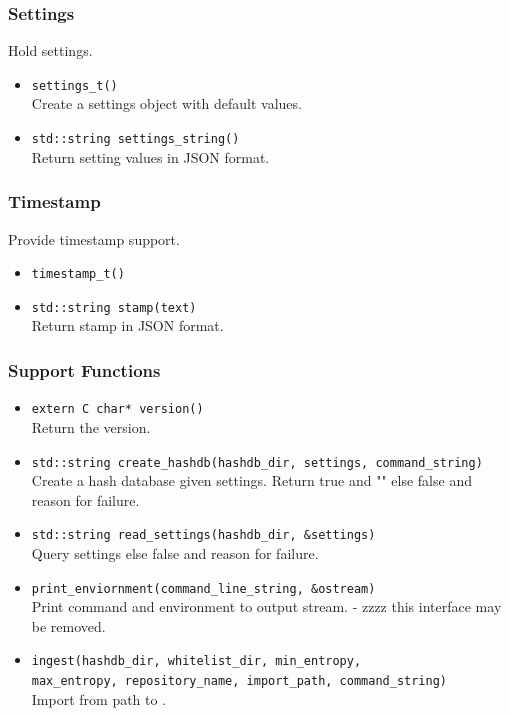 \documentclass[11pt,fleqn]{article} %
\begin{document}
\subsubsection{Settings}
Hold \hdb settings.

\begin{itemize}
\item \verb+settings_t()+\\
Create a settings object with default values.
\item \verb+std::string settings_string()+\\
Return setting values in JSON format.
\end{itemize}

\subsubsection{Timestamp}
Provide timestamp support.

\begin{itemize}
\item \verb+timestamp_t()+
\item \verb+std::string stamp(text)+\\
Return stamp in JSON format.
\end{itemize}

\subsubsection{Support Functions}

\begin{itemize}
\item \verb+extern C char* version()+\\
Return the \hdb version.
\item \verb+std::string create_hashdb(hashdb_dir, settings, command_string)+\\
Create a hash database given settings. Return true and "" else false and reason for failure.
\item \verb+std::string read_settings(hashdb_dir, &settings)+\\
Query settings else false and reason for failure.
\item \verb+print_enviornment(command_line_string, &ostream)+\\
Print command and environment to output stream. - zzzz this interface may be removed.
\item \verb+ingest(hashdb_dir, whitelist_dir, min_entropy,+\\
\verb+max_entropy, repository_name, import_path, command_string)+\\
Import from path to \hdb.
\end{itemize}
\end{document}

